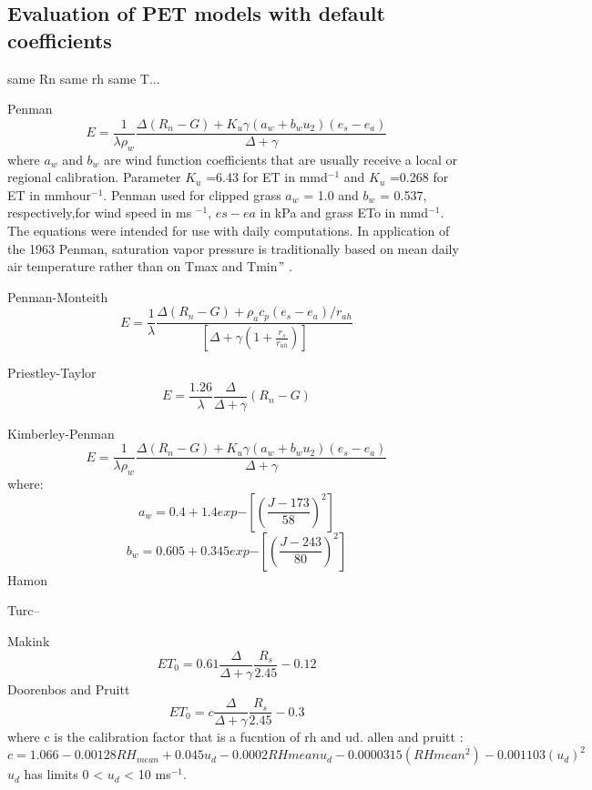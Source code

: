 \documentclass[hydrology,article,submit,moreauthors,pdftex]{Definitions/mdpi}
\begin{document}
\subsection{Evaluation of PET models with default coefficients}
same Rn same rh same T...

Penman 
\begin{equation}
E = \frac{1}{\lambda \rho_w} \frac{\Delta (R_{n}-G) + K_u \gamma(a_w+b_wu_2)(e_{s}-e_{a})}{\Delta +\gamma}
\end{equation}
where $a_w$ and $b_w$ are wind function coefficients that are usually receive a local or regional calibration.
Parameter $K_u$ =6.43 for ET in mmd$^{-1}$ and $K_u$ =0.268 for ET in mmhour$^{-1}$.
Penman \cite{penman1963vegetation} used for clipped grass \cite{asce2005asce} $a_w$ = 1.0 and $b_w$ = 0.537, respectively,for wind speed in ms $^{-1}$, $es-ea$ in kPa and grass ETo in mmd$^{-1}$. The equations were intended for use with daily computations. In application of the 1963 Penman, saturation vapor pressure is traditionally based on mean daily air temperature rather than on Tmax and Tmin$"$ \cite{jensen1990evapotranspiration}.



Penman-Monteith \cite{asce2005asce}
\begin{equation}
E = \frac{1}{\lambda} \frac{\Delta (R_{n}-G)+ \rho_a c_p  (e_{s}-e_{a})/r_{ah}}{\left[ \Delta +\gamma (1+\frac{r_s}{r_{ah}})\right]}
\end{equation}

Priestley-Taylor \cite{asce2005asce}
\begin{equation}
E = \frac{1.26}{\lambda} \frac{\Delta}{\Delta +\gamma}(R_{n}-G)
\end{equation}

Kimberley-Penman \cite{asce2005asce}
\begin{equation}
E = \frac{1}{\lambda \rho_w} \frac{\Delta (R_{n}-G) + K_u \gamma(a_w+b_wu_2)(e_{s}-e_{a})}{\Delta +\gamma} 
\end{equation}
where:
\begin{equation}
a_w = 0.4 + 1.4 exp{-\left[\left(\frac{J-173}{58}\right)^2\right]}
\end{equation}
\begin{equation}
b_w = 0.605 + 0.345 exp{-\left[\left(\frac{J-243}{80}\right)^2\right]}
\end{equation}
Hamon

Turc--

Makink \cite{asce2005asce}
\begin{equation}
ET_0 = 0.61 \frac{\Delta}{\Delta+\gamma}\frac{R_s}{2.45}-0.12
\end{equation}
Doorenbos and Pruitt \cite{doorenbos1977crop}
\begin{equation}
ET_0 = c \frac{\Delta}{\Delta+\gamma}\frac{R_s}{2.45}-0.3
\end{equation}
where c is the calibration factor that is a fucntion of rh and ud.
allen and pruitt \cite{allen1991fao}:
\begin{equation}
c = 1.066-0.00128 RH_{mean} + 0.045u_d -0.0002RH{mean}u_d-0.0000315(RH{mean}^2)-0.001103(u_d)^2
\end{equation}
$u_d$ has limits 0 < $u_d$ < 10 ms$^{-1}$.
\end{document}
